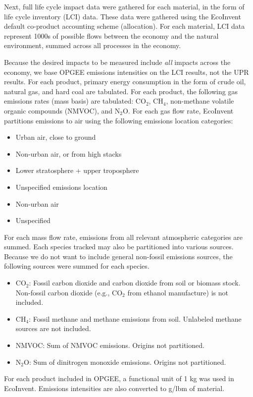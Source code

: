 \documentclass[11pt]{report}
\begin{document}
Next, full life cycle impact data were gathered for each material, in the form of life cycle inventory (LCI) data. These data were gathered using the EcoInvent default co-product accounting scheme (allocation). For each material, LCI data represent 1000s of possible flows between the economy and the natural environment, summed across all processes in the economy. 

Because the desired impacts to be measured include \emph{all} impacts across the economy, we base OPGEE emissions intensities on the LCI results, not the UPR results. For each product, primary energy consumption in the form of crude oil, natural gas, and hard coal are tabulated. For each product, the following gas emissions rates (mass basis) are tabulated: CO$_2$, CH$_4$, non-methane volatile organic compounds (NMVOC), and N$_2$O. For each gas flow rate, EcoInvent partitions emissions to air using the following emissions location categories:
\begin{itemize}
\item Urban air, close to ground
\item Non-urban air, or from high stacks
\item Lower stratosphere + upper troposphere
\item Unspecified emissions location
\item Non-urban air
\item Unspecified
\end{itemize}

For each mass flow rate, emissions from all relevant atmospheric categories are summed. Each species tracked may also be partitioned into various sources. Because we do not want to include general non-fossil emissions sources, the following sources were summed for each species.
\begin{itemize}
\item CO$_2$: Fossil carbon dioxide and carbon dioxide from soil or biomass stock. Non-fossil carbon dioxide (e.g., CO$_2$ from ethanol manufacture) is not included.
\item CH$_4$: Fossil methane and methane emissions from soil. Unlabeled methane sources are not included.
\item NMVOC: Sum of NMVOC emissions. Origins not partitioned.
\item N$_2$O: Sum of dinitrogen monoxide emissions. Origins not partitioned.
\end{itemize}

For each product included in OPGEE, a functional unit of 1 kg was used in EcoInvent. Emissions intensities are also converted to g/lbm of material.
\end{document}
